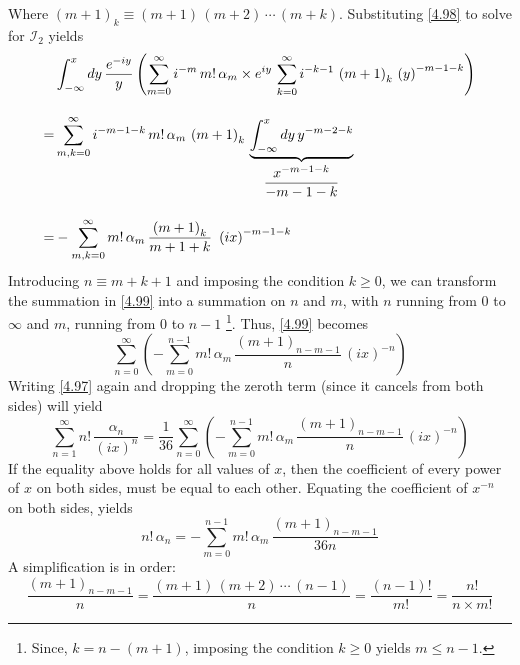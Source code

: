 \documentclass[12pt,a4paper]{article}
\begin{document}
	Where $\left( m + 1 \right)_{k} \equiv \left( m + 1 \right)\, \left( m + 2 \right)\, \cdots\, \left( m + k \right)$. Substituting \eqref{4.98} to solve for $\mathcal{I}_{2}$ yields
	\begin{align}
		&\int_{-\infty}^{x} dy\, \frac{e^{-iy}}{y} \left( \sum_{m = 0}^{\infty} i^{-m}\, m!\, \alpha_{m} \times e^{iy}\, \sum_{k = 0}^{\infty} i^{-k-1}\, \left( m + 1 \right)_{k}\, \left( y \right)^{-m-1-k} \right) \notag \\[10pt]
		=& \sum_{m, k = 0}^{\infty} i^{-m-1-k}\, m!\, \alpha_{m}\, \left( m + 1 \right)_{k}\, \underbrace{\int_{-\infty}^{x} dy\, y^{-m-2-k}}_{\dfrac{x^{-m-1-k}}{-m-1-k}} \notag \\[10pt]
		=& -\sum_{m, k = 0}^{\infty} m!\, \alpha_{m}\, \dfrac{\left( m + 1 \right)_{k}}{m+1+ k}\ \left( ix \right)^{-m-1-k} \label{4.99}
	\end{align}
	Introducing $n \equiv m+k+1$ and imposing the condition $k \geq 0$, we can transform the summation in \eqref{4.99} into a summation on $n$ and $m$, with $n$ running from $0$ to $\infty$ and $m$, running from $0$ to $n-1$ \footnote{Since, $k = n - (m+1)$, imposing the condition $k \geq 0$ yields $ m \leq n-1$.}. Thus, \eqref{4.99} becomes
	\begin{equation}
		\sum_{n = 0}^{\infty} \left( -\sum_{m = 0}^{n-1} m!\, \alpha_{m}\, \dfrac{\left( m+1 \right)_{n-m-1}}{n}\, \left( ix \right)^{-n} \right) \label{4.100}
	\end{equation}
	Writing \eqref{4.97} again and dropping the zeroth term (since it cancels from both sides) will yield
	\begin{equation}
		\sum_{n = 1}^{\infty} n!\, \dfrac{\alpha_{n}}{\left( ix \right)^{n}} = \frac{1}{36} \sum_{n = 0}^{\infty} \left( -\sum_{m = 0}^{n-1} m!\, \alpha_{m}\, \dfrac{\left( m+1 \right)_{n-m-1}}{n}\, \left( ix \right)^{-n} \right) \label{4.101}
	\end{equation}
	If the equality above holds for all values of $x$, then the coefficient of every power of $x$ on both sides, must be equal to each other. Equating the coefficient of $x^{-n}$ on both sides, yields
	\begin{equation}
		n!\, \alpha_{n} = -\sum_{m = 0}^{n-1} m!\, \alpha_{m}\, \dfrac{\left( m+1 \right)_{n-m-1}}{36n} \label{4.102}
	\end{equation}
	A simplification is in order:
	\begin{equation}
		\dfrac{\left( m+1 \right)_{n-m-1}}{n} = \dfrac{\left( m + 1 \right)\, \left( m + 2 \right)\, \cdots\, \left( n-1 \right)}{n} = \dfrac{\left( n-1 \right)!}{m!} = \dfrac{n!}{n \times m!} \label{4.103}
	\end{equation}
\end{document}
